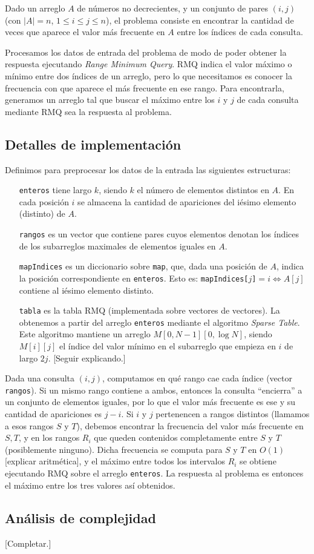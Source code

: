 Dado un arreglo $A$ de números no decrecientes, y un conjunto de pares $(i,j)$
(con $|A|=n$, $1 \le i \le j \le n$), el problema consiste en encontrar la
cantidad de veces que aparece el valor más frecuente en $A$ entre los índices de
cada consulta.

Procesamos los datos de entrada del problema de modo de poder obtener la
respuesta ejecutando {\sl Range Minimum Query}. RMQ indica el valor máximo o
mínimo entre dos índices de un arreglo, pero lo que necesitamos es conocer la
frecuencia con que aparece el más frecuente en ese rango. Para encontrarla,
generamos un arreglo tal que buscar el máximo entre los $i$ y $j$ de cada
consulta mediante RMQ sea la respuesta al problema.

\subsection*{Detalles de implementación}

Definimos para preprocesar los datos de la entrada las siguientes estructuras:

\begin{itemize}
  \item[\tt enteros] tiene largo $k$, siendo $k$ el número de elementos
  distintos en $A$. En cada posición $i$ se almacena la cantidad de apariciones
  del iésimo elemento (distinto) de $A$.

  \item[\tt rangos] es un vector que contiene pares cuyos elementos denotan
  los índices de los subarreglos maximales de elementos iguales en $A$.

  \item[\tt mapIndices] es un diccionario sobre {\tt map}, que, dada una
  posición de $A$, indica la posición correspondiente en {\tt enteros}. Esto es:
  {\tt mapIndices[$j$]}$=i \Leftrightarrow A[j]$ contiene al iésimo elemento
  distinto.

  \item[\tt tabla] es la tabla RMQ (implementada sobre vectores de vectores).
  La obtenemos a partir del arreglo {\tt enteros} mediante el algoritmo {\sl
  Sparse Table}. Este algoritmo mantiene un arreglo $M[0,N-1][0,\log N]$,
  siendo $M[i][j]$ el índice del valor mínimo en el subarreglo que empieza en
  $i$ de largo $2j$. [Seguir explicando.] \cite{topcoder}
\end{itemize}

Dada una consulta $(i,j)$, computamos en qué rango cae cada índice (vector
{\tt rangos}). Si un mismo rango contiene a ambos, entonces la consulta ``encierra''
a un conjunto de elementos iguales, por lo que el valor más frecuente es ese y
su cantidad de apariciones es $j-i$. Si $i$ y $j$ pertenencen a rangos distintos
(llamamos a esos rangos $S$ y $T$), debemos encontrar la frecuencia del valor más
frecuente en $S,T$, y en los rangos $R_i$ que queden contenidos completamente
entre $S$ y $T$ (posiblemente ninguno). Dicha frecuencia se computa para $S$ y
$T$ en $O(1)$ [explicar aritmética], y el máximo entre todos los intervalos $R_i$
se obtiene ejecutando RMQ sobre el arreglo {\tt enteros}. La respuesta al
problema es entonces el máximo entre los tres valores así obtenidos.

\subsection*{Análisis de complejidad}

[Completar.]



